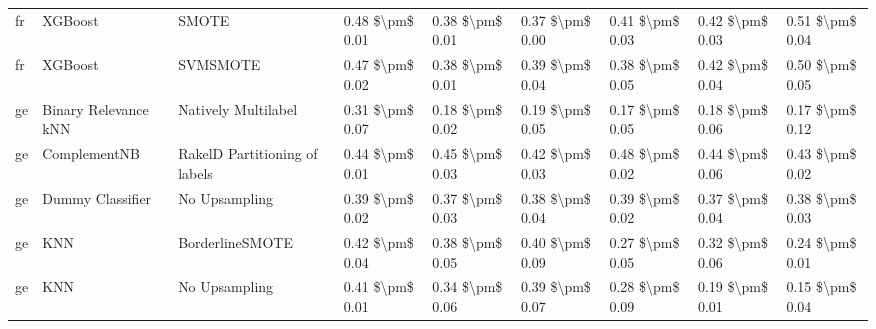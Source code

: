 \begin{tabular}{lllllllll}
      fr &                         XGBoost &                         SMOTE & 0.48 \$\textbackslash pm\$ 0.01 &           0.38 \$\textbackslash pm\$ 0.01 &       0.37 \$\textbackslash pm\$ 0.00 &        0.41 \$\textbackslash pm\$ 0.03 &                         0.42 \$\textbackslash pm\$ 0.03 &     0.51 \$\textbackslash pm\$ 0.04 \\
      fr &                         XGBoost &                      SVMSMOTE & 0.47 \$\textbackslash pm\$ 0.02 &           0.38 \$\textbackslash pm\$ 0.01 &       0.39 \$\textbackslash pm\$ 0.04 &        0.38 \$\textbackslash pm\$ 0.05 &                         0.42 \$\textbackslash pm\$ 0.04 &     0.50 \$\textbackslash pm\$ 0.05 \\
      ge &            Binary Relevance kNN &           Natively Multilabel & 0.31 \$\textbackslash pm\$ 0.07 &           0.18 \$\textbackslash pm\$ 0.02 &       0.19 \$\textbackslash pm\$ 0.05 &        0.17 \$\textbackslash pm\$ 0.05 &                         0.18 \$\textbackslash pm\$ 0.06 &     0.17 \$\textbackslash pm\$ 0.12 \\
      ge &                    ComplementNB & RakelD Partitioning of labels & 0.44 \$\textbackslash pm\$ 0.01 &           0.45 \$\textbackslash pm\$ 0.03 &       0.42 \$\textbackslash pm\$ 0.03 &        0.48 \$\textbackslash pm\$ 0.02 &                         0.44 \$\textbackslash pm\$ 0.06 &     0.43 \$\textbackslash pm\$ 0.02 \\
      ge &                Dummy Classifier &                 No Upsampling & 0.39 \$\textbackslash pm\$ 0.02 &           0.37 \$\textbackslash pm\$ 0.03 &       0.38 \$\textbackslash pm\$ 0.04 &        0.39 \$\textbackslash pm\$ 0.02 &                         0.37 \$\textbackslash pm\$ 0.04 &     0.38 \$\textbackslash pm\$ 0.03 \\
      ge &                             KNN &               BorderlineSMOTE & 0.42 \$\textbackslash pm\$ 0.04 &           0.38 \$\textbackslash pm\$ 0.05 &       0.40 \$\textbackslash pm\$ 0.09 &        0.27 \$\textbackslash pm\$ 0.05 &                         0.32 \$\textbackslash pm\$ 0.06 &     0.24 \$\textbackslash pm\$ 0.01 \\
      ge &                             KNN &                 No Upsampling & 0.41 \$\textbackslash pm\$ 0.01 &           0.34 \$\textbackslash pm\$ 0.06 &       0.39 \$\textbackslash pm\$ 0.07 &        0.28 \$\textbackslash pm\$ 0.09 &                         0.19 \$\textbackslash pm\$ 0.01 &     0.15 \$\textbackslash pm\$ 0.04 \\

\end{tabular}

